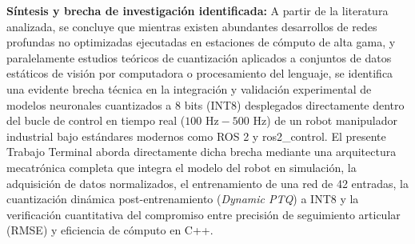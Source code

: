 \documentclass[12pt]{article}
\begin{document}
\textbf{Síntesis y brecha de investigación identificada:} 
A partir de la literatura analizada, se concluye que mientras existen abundantes desarrollos de redes profundas no optimizadas ejecutadas en estaciones de cómputo de alta gama, y paralelamente estudios teóricos de cuantización aplicados a conjuntos de datos estáticos de visión por computadora o procesamiento del lenguaje, se identifica una evidente brecha técnica en la integración y validación experimental de modelos neuronales cuantizados a 8 bits (INT8) desplegados directamente dentro del bucle de control en tiempo real ($100\text{ Hz} - 500\text{ Hz}$) de un robot manipulador industrial bajo estándares modernos como ROS 2 y ros2\_control. El presente Trabajo Terminal aborda directamente dicha brecha mediante una arquitectura mecatrónica completa que integra el modelo del robot en simulación, la adquisición de datos normalizados, el entrenamiento de una red de 42 entradas, la cuantización dinámica post-entrenamiento (\textit{Dynamic PTQ}) a INT8 y la verificación cuantitativa del compromiso entre precisión de seguimiento articular (RMSE) y eficiencia de cómputo en C++.
\end{document}

